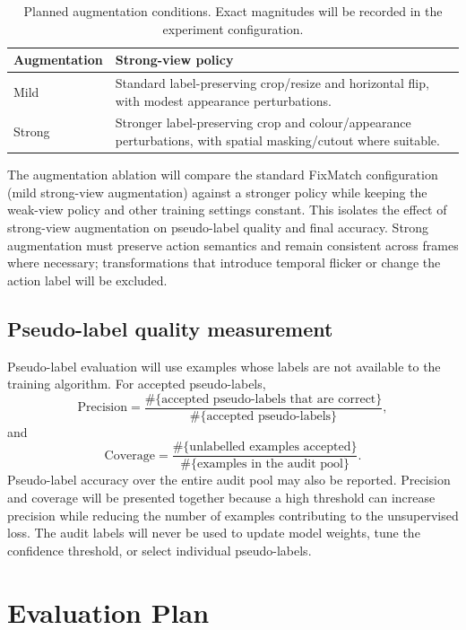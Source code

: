 \documentclass[11pt,a4paper]{article}
\begin{document}
\begin{table}[H]
\centering
\small
\caption{Planned augmentation conditions. Exact magnitudes will be recorded in the experiment configuration.}
\begin{tabularx}{\textwidth}{L{2.5cm}Y}
\toprule
\textbf{Augmentation} & \textbf{Strong-view policy} \\
\midrule
Mild & Standard label-preserving crop/resize and horizontal flip, with modest appearance perturbations. \\
Strong & Stronger label-preserving crop and colour/appearance perturbations, with spatial masking/cutout where suitable. \\
\bottomrule
\end{tabularx}
\end{table}


The augmentation ablation will compare the standard FixMatch configuration (mild strong-view augmentation) against a stronger policy while keeping the weak-view policy and other training settings constant. This isolates the effect of strong-view augmentation on pseudo-label quality and final accuracy. Strong augmentation must preserve action semantics and remain consistent across frames where necessary; transformations that introduce temporal flicker or change the action label will be excluded.

\subsection{Pseudo-label quality measurement}
Pseudo-label evaluation will use examples whose labels are not available to the training algorithm. For accepted pseudo-labels,
\[
\text{Precision} =
\frac{\#\{\text{accepted pseudo-labels that are correct}\}}
{\#\{\text{accepted pseudo-labels}\}},
\]
and
\[
\text{Coverage} =
\frac{\#\{\text{unlabelled examples accepted}\}}
{\#\{\text{examples in the audit pool}\}}.
\]
Pseudo-label accuracy over the entire audit pool may also be reported. Precision and coverage will be presented together because a high threshold can increase precision while reducing the number of examples contributing to the unsupervised loss. The audit labels will never be used to update model weights, tune the confidence threshold, or select individual pseudo-labels.

\section{Evaluation Plan}
\end{document}
